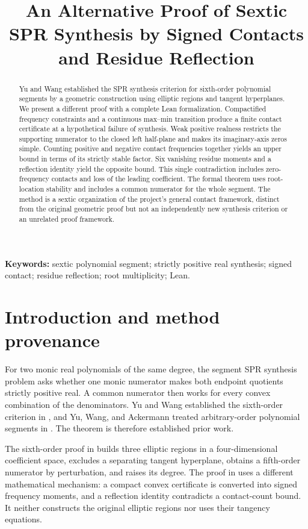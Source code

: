\documentclass[11pt]{article}
\title{An Alternative Proof of Sextic SPR Synthesis by Signed Contacts and Residue Reflection}
\begin{document}
\maketitle
\begin{abstract}
Yu and Wang established the SPR synthesis criterion for sixth-order polynomial segments by a geometric construction using elliptic regions and tangent hyperplanes. We present a different proof with a complete Lean formalization. Compactified frequency constraints and a continuous max--min transition produce a finite contact certificate at a hypothetical failure of synthesis. Weak positive realness restricts the supporting numerator to the closed left half-plane and makes its imaginary-axis zeros simple. Counting positive and negative contact frequencies together yields an upper bound in terms of its strictly stable factor. Six vanishing residue moments and a reflection identity yield the opposite bound. This single contradiction includes zero-frequency contacts and loss of the leading coefficient. The formal theorem uses root-location stability and includes a common numerator for the whole segment. The method is a sextic organization of the project's general contact framework, distinct from the original geometric proof but not an independently new synthesis criterion or an unrelated proof framework.
\end{abstract}
\noindent\textbf{Keywords:} sextic polynomial segment; strictly positive real synthesis; signed contact; residue reflection; root multiplicity; Lean.

\section{Introduction and method provenance}
For two monic real polynomials of the same degree, the segment SPR synthesis problem asks whether one monic numerator makes both endpoint quotients strictly positive real. A common numerator then works for every convex combination of the denominators. Yu and Wang established the sixth-order criterion in \cite{yuWang2003}, and Yu, Wang, and Ackermann treated arbitrary-order polynomial segments in \cite{yuWangAckermann2003}. The theorem is therefore established prior work.

The sixth-order proof in \cite{yuWang2003} builds three elliptic regions in a four-dimensional coefficient space, excludes a separating tangent hyperplane, obtains a fifth-order numerator by perturbation, and raises its degree. The proof in  uses a different mathematical mechanism: a compact convex certificate is converted into signed frequency moments, and a reflection identity contradicts a contact-count bound. It neither constructs the original elliptic regions nor uses their tangency equations.
\end{document}
